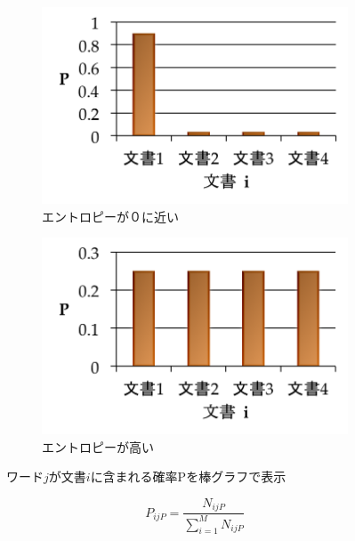 \documentclass[review]{elsarticle}
\begin{document}
\begin{CJK}{UTF8}{min}
\begin{figure}[h]
    \centering
    \begin{subfigure}[b]{0.4\linewidth}
        \includegraphics[width=\linewidth]{entropyzero_jp.png}
        \caption{エントロピーが０に近い}
    \end{subfigure}
    \begin{subfigure}[b]{0.4\linewidth}
        \includegraphics[width=\linewidth]{entropyhigh_jp.png}
        \caption{エントロピーが高い}
    \end{subfigure}
\caption{ワード\(j\)が文書\(i\)に含まれる確率Pを棒グラフで表示}
\label{fig:entropygraphs}
\end{figure}



\begin{equation}\label{eq:PijP}
P_{ijP} = \frac{N_{ijP}}{\sum_{i=1}^M N_{ijP}}
\end{equation}


\end{CJK}
\end{document}
